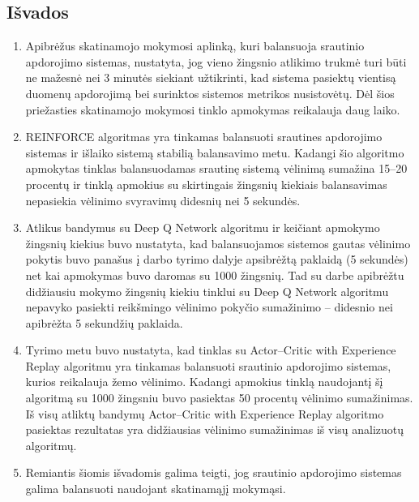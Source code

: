 \documentclass{VUMIFPSbakalaurinis}
\begin{document}
\subsection*{Išvados}

\begin{enumerate}
    \item Apibrėžus skatinamojo mokymosi aplinką, kuri balansuoja srautinio apdorojimo sistemas, nustatyta, jog vieno žingsnio atlikimo trukmė turi būti ne mažesnė nei 3 minutės siekiant užtikrinti, kad sistema pasiektų vientisą duomenų apdorojimą bei surinktos sistemos metrikos nusistovėtų. Dėl šios priežasties skatinamojo mokymosi tinklo apmokymas reikalauja daug laiko.
    \item REINFORCE algoritmas yra tinkamas balansuoti srautines apdorojimo sistemas ir išlaiko sistemą stabilią balansavimo metu. Kadangi šio algoritmo apmokytas tinklas balansuodamas srautinę sistemą vėlinimą sumažina 15–20 procentų ir tinklą apmokius su skirtingais žingsnių kiekiais balansavimas nepasiekia vėlinimo svyravimų didesnių nei 5 sekundės. 
    \item Atlikus bandymus su Deep Q Network algoritmu ir keičiant apmokymo žingsnių kiekius buvo nustatyta, kad balansuojamos sistemos gautas vėlinimo pokytis buvo panašus į darbo tyrimo dalyje apsibrėžtą paklaidą (5 sekundės) net kai apmokymas buvo daromas su 1000 žingsnių. Tad su darbe apibrėžtu didžiausiu mokymo žingsnių kiekiu tinklui su Deep Q Network algoritmu nepavyko pasiekti reikšmingo vėlinimo pokyčio sumažinimo – didesnio nei apibrėžta 5 sekundžių paklaida. 
    \item Tyrimo metu buvo nustatyta, kad tinklas su Actor–Critic with Experience Replay algoritmu yra tinkamas balansuoti srautinio apdorojimo sistemas, kurios reikalauja žemo vėlinimo. Kadangi apmokius tinklą naudojantį šį algoritmą su 1000 žingsniu buvo pasiektas 50 procentų vėlinimo sumažinimas. Iš visų atliktų bandymų Actor–Critic with Experience Replay algoritmo pasiektas rezultatas yra didžiausias vėlinimo sumažinimas iš visų analizuotų algoritmų.
    \item Remiantis šiomis išvadomis galima teigti, jog srautinio apdorojimo sistemas galima balansuoti naudojant skatinamąjį mokymąsi.
\end{enumerate}

\printbibliography[heading=bibintoc] 

\appendix
\end{document}
